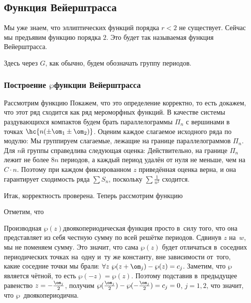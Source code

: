 \documentclass[a4paper]{article}
\begin{document}
\subsection{Функция Вейерштрасса}

Мы уже знаем, что эллиптических функций порядка $r < 2$ не существует.
Сейчас мы предъявим функцию порядка $2$. Это будет так называемая функция Вейерштрасса.

Здесь через $G$, как обычно, будем обозначать группу периодов.

\subsubsection{Построение $\wp$\д функции Вейерштрасса}

Рассмотрим функцию
Покажем, что это определение корректно, то есть докажем, что этот ряд сходится как ряд мероморфных функций.
В качестве системы раздувающихся компактов будем брать параллелограммы $\Pi_n$ с вершинами в точках
$\hc{n(\pm \om_1 \pm \om_2)}$. Оценим каждое слагаемое исходного ряда по модулю:
Мы группируем слагаемые, лежащие на границе параллелограммов $\Pi_n$. Для $n$\д й группы справедлива
следующая оценка:
Действительно, на границе $\Pi_n$ лежит не более $8n$ периодов, а каждый период удалён от нуля
не меньше, чем на $C\cdot n$. Поэтому при каждом фиксированном $z$ приведённая оценка верна,
и она гарантирует сходимость ряда $\sum S_n$, поскольку $\sum\frac1{n^2}$ сходится.

Итак, корректность проверена. Теперь рассмотрим функцию

Отметим, что

Производная $\wp(z)$\ч двоякопериодическая функция просто в~силу того, что она представляет
из себя честную сумму по всей решётке периодов. Сдвинув $z$ на~$w$, мы не поменяем сумму.
Это значит, что сама $\wp(z)$ будет отличаться в~соседних периодических точках на~одну и~ту же константу,
вне зависимости от~того, какие соседние точки мы брали:
$\forall z \ \wp(z+\om_j) - \wp(z) = c_j$.
Заметим, что $\wp$ является чётной, то есть $\wp(-z) = \wp(z)$.
Поэтому подставив в~предыдущее равенство $z = -\frac{\om_j}{2}$, получим
$\wp(\frac{\om_j}{2}) - \wp(-\frac{\om_j}{2}) = c_j = 0$, $j=1,2$, что значит, что $\wp$~двоякопериодична.
\end{document}
